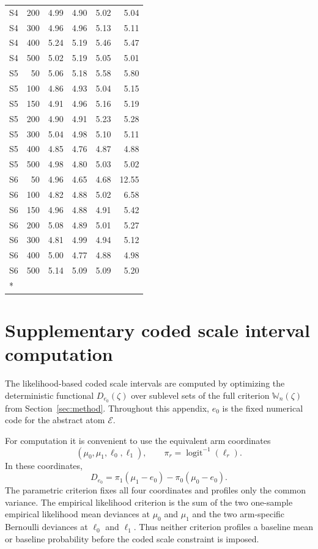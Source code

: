 \documentclass[11pt]{article}
\DeclareMathOperator{\logit}{logit}
\begin{document}
\begin{longtable}[t]{lrrrrr}
S4 & 200 & 4.99 & 4.90 & 5.02 & 5.04\\
S4 & 300 & 4.96 & 4.96 & 5.13 & 5.11\\
S4 & 400 & 5.24 & 5.19 & 5.46 & 5.47\\
S4 & 500 & 5.02 & 5.19 & 5.05 & 5.01\\
S5 & 50 & 5.06 & 5.18 & 5.58 & 5.80\\
S5 & 100 & 4.86 & 4.93 & 5.04 & 5.15\\
S5 & 150 & 4.91 & 4.96 & 5.16 & 5.19\\
S5 & 200 & 4.90 & 4.91 & 5.23 & 5.28\\
S5 & 300 & 5.04 & 4.98 & 5.10 & 5.11\\
S5 & 400 & 4.85 & 4.76 & 4.87 & 4.88\\
S5 & 500 & 4.98 & 4.80 & 5.03 & 5.02\\
S6 & 50 & 4.96 & 4.65 & 4.68 & 12.55\\
S6 & 100 & 4.82 & 4.88 & 5.02 & 6.58\\
S6 & 150 & 4.96 & 4.88 & 4.91 & 5.42\\
S6 & 200 & 5.08 & 4.89 & 5.01 & 5.27\\
S6 & 300 & 4.81 & 4.99 & 4.94 & 5.12\\
S6 & 400 & 5.00 & 4.77 & 4.88 & 4.98\\
S6 & 500 & 5.14 & 5.09 & 5.09 & 5.20\\*
\end{longtable}
\endgroup{}

\section{Supplementary coded scale interval computation}
\label{app:supplementary-delta-intervals}

The likelihood-based coded scale intervals are computed by optimizing the deterministic functional $D_{e_0}(\zeta)$ over sublevel sets of the full criterion $\mathbb{W}_n(\zeta)$ from Section~\ref{sec:method}. Throughout this appendix, $e_0$ is the fixed numerical code for the abstract atom $\mathcal{E}$.

For computation it is convenient to use the equivalent arm coordinates
\[
  (\mu_0,\mu_1,\ell_0,\ell_1),
  \qquad
  \pi_r=\logit^{-1}(\ell_r).
\]
In these coordinates,
\[
  D_{e_0}
  =
  \pi_1(\mu_1-e_0)-\pi_0(\mu_0-e_0).
\]
The parametric criterion fixes all four coordinates and profiles only the common variance. The empirical likelihood criterion is the sum of the two one-sample empirical likelihood mean deviances at $\mu_0$ and $\mu_1$ and the two arm-specific Bernoulli deviances at $\ell_0$ and $\ell_1$. Thus neither criterion profiles a baseline mean or baseline probability before the coded scale constraint is imposed.
\end{document}
